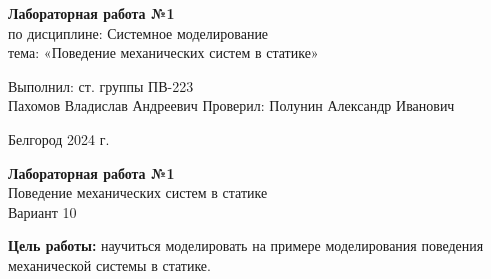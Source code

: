 \documentclass[a4paper,14pt]{extarticle}
\newcommand\textbox[1]{
	\parbox{.45\textwidth}{#1}
}
\begin{document}
\vfill
\begin{center}
    \large{
        \textbf{
            Лабораторная работа №1}}\\
    \normalsize{
        по дисциплине: Системное моделирование \\
        тема: «Поведение механических систем в статике»}
\end{center}
\vfill
\hfill\textbox{
    Выполнил: ст. группы ПВ-223\\Пахомов Владислав Андреевич
    \bigbreak
    Проверил: Полунин Александр Иванович
}
\vfill\begin{center}
    Белгород 2024 г.
\end{center}
\newpage
\begin{center}
    \textbf{Лабораторная работа №1}\\
    Поведение механических систем в статике\\
    Вариант 10
\end{center}
\textbf{Цель работы: }научиться моделировать на примере моделирования поведения механической системы в статике.
\end{document}
